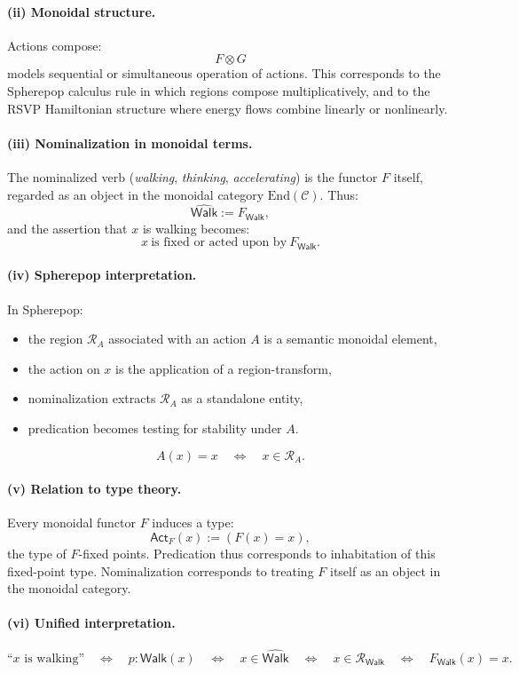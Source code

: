 \documentclass[12pt,letterpaper]{article}
\begin{document}
\paragraph{(ii) Monoidal structure.}
Actions compose:
\[
F \otimes G
\]
models sequential or simultaneous operation of actions.  This corresponds to the
Spherepop calculus rule in which regions compose multiplicatively, and to the
RSVP Hamiltonian structure where energy flows combine linearly or
nonlinearly.

\paragraph{(iii) Nominalization in monoidal terms.}
The nominalized verb (\emph{walking}, \emph{thinking}, \emph{accelerating}) is
the functor $F$ itself, regarded as an object in the monoidal category
$\mathrm{End}(\mathcal{C})$.  Thus:
\[
\widehat{\mathsf{Walk}} := F_{\mathsf{Walk}},
\]
and the assertion that $x$ is walking becomes:
\[
x\ \text{is fixed or acted upon by}\ F_{\mathsf{Walk}}.
\]

\paragraph{(iv) Spherepop interpretation.}
In Spherepop:
\begin{itemize}
    \item the region $\mathcal{R}_A$ associated with an action $A$ is a semantic
    monoidal element,
    \item the action on $x$ is the application of a region-transform,
    \item nominalization extracts $\mathcal{R}_A$ as a standalone entity,
    \item predication becomes testing for stability under $A$.
\end{itemize}

\[
A(x) = x
\quad\Longleftrightarrow\quad
x \in \mathcal{R}_A.
\]

\paragraph{(v) Relation to type theory.}
Every monoidal functor $F$ induces a type:
\[
\mathsf{Act}_F(x) := (F(x) = x),
\]
the type of $F$-fixed points.  Predication thus corresponds to inhabitation of
this fixed-point type.  Nominalization corresponds to treating $F$ itself as an
object in the monoidal category.

\paragraph{(vi) Unified interpretation.}
\[
\text{``$x$ is walking''}
\quad\Longleftrightarrow\quad
p : \mathsf{Walk}(x)
\quad\Longleftrightarrow\quad
x \in \widehat{\mathsf{Walk}}
\quad\Longleftrightarrow\quad
x \in \mathcal{R}_{\mathsf{Walk}}
\quad\Longleftrightarrow\quad
F_{\mathsf{Walk}}(x) = x.
\]
\end{document}
